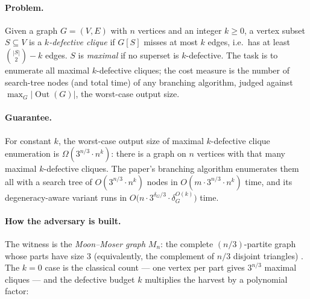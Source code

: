 \paragraph{Problem.}
Given a graph $G=(V,E)$ with $n$ vertices and an integer $k \ge 0$, a vertex subset
$S \subseteq V$ is a \emph{$k$-defective clique} if $G[S]$ misses at most $k$ edges, i.e.\ has
at least $\binom{|S|}{2} - k$ edges. $S$ is \emph{maximal} if no superset is $k$-defective. The
task is to enumerate all maximal $k$-defective cliques; the cost measure is the number of
search-tree nodes (and total time) of any branching algorithm, judged against
$\max_G |\operatorname{Out}(G)|$, the worst-case output size.


\paragraph{Guarantee.}

\begin{theorem}\label{thm:adv-defclique}
For constant $k$, the worst-case output size of maximal $k$-defective clique enumeration is
$\Omega(3^{n/3}\cdot n^k)$: there is a graph on $n$ vertices with that many maximal
$k$-defective cliques. The paper's branching algorithm enumerates them all with a search tree
of $O(3^{n/3}\cdot n^k)$ nodes in $O(m\cdot 3^{n/3}\cdot n^k)$ time, and its degeneracy-aware
variant runs in $O\bigl(n\cdot 3^{\delta_G/3}\cdot \delta_G^{O(k)}\bigr)$ time. \eop
\end{theorem}

\paragraph{How the adversary is built.}
The witness is the \emph{Moon--Moser graph} $M_n$: the complete $(n/3)$-partite graph whose
parts have size $3$ (equivalently, the complement of $n/3$ disjoint triangles)
\citep{adversarial-construction-bg4}. The $k=0$ case is the classical count --- one vertex per
part gives $3^{n/3}$ maximal cliques --- and the defective budget $k$ multiplies the harvest by
a polynomial factor:

